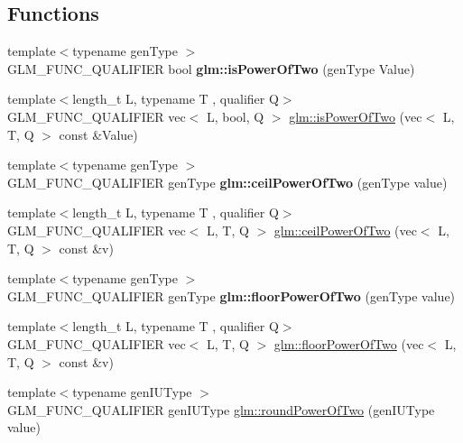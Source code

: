 \subsection*{Functions}
\begin{DoxyCompactItemize}
\item 
\mbox{\label{round_8inl_a2e60d24d864637d3ebd62e6fa4941613}} 
{\footnotesize template$<$typename gen\+Type $>$ }\\G\+L\+M\+\_\+\+F\+U\+N\+C\+\_\+\+Q\+U\+A\+L\+I\+F\+I\+ER bool {\bfseries glm\+::is\+Power\+Of\+Two} (gen\+Type Value)
\item 
{\footnotesize template$<$length\+\_\+t L, typename T , qualifier Q$>$ }\\G\+L\+M\+\_\+\+F\+U\+N\+C\+\_\+\+Q\+U\+A\+L\+I\+F\+I\+ER vec$<$ L, bool, Q $>$ \hyperlink{group__gtc__round_gabf2b61ded7049bcb13e25164f832a290}{glm\+::is\+Power\+Of\+Two} (vec$<$ L, T, Q $>$ const \&Value)
\item 
\mbox{\label{round_8inl_a15ad0f1b70561471f34bc2e43469424e}} 
{\footnotesize template$<$typename gen\+Type $>$ }\\G\+L\+M\+\_\+\+F\+U\+N\+C\+\_\+\+Q\+U\+A\+L\+I\+F\+I\+ER gen\+Type {\bfseries glm\+::ceil\+Power\+Of\+Two} (gen\+Type value)
\item 
{\footnotesize template$<$length\+\_\+t L, typename T , qualifier Q$>$ }\\G\+L\+M\+\_\+\+F\+U\+N\+C\+\_\+\+Q\+U\+A\+L\+I\+F\+I\+ER vec$<$ L, T, Q $>$ \hyperlink{group__gtc__round_gab53d4a97c0d3e297be5f693cdfdfe5d2}{glm\+::ceil\+Power\+Of\+Two} (vec$<$ L, T, Q $>$ const \&v)
\item 
\mbox{\label{round_8inl_ac1385510b859757901e927c43bf4f329}} 
{\footnotesize template$<$typename gen\+Type $>$ }\\G\+L\+M\+\_\+\+F\+U\+N\+C\+\_\+\+Q\+U\+A\+L\+I\+F\+I\+ER gen\+Type {\bfseries glm\+::floor\+Power\+Of\+Two} (gen\+Type value)
\item 
{\footnotesize template$<$length\+\_\+t L, typename T , qualifier Q$>$ }\\G\+L\+M\+\_\+\+F\+U\+N\+C\+\_\+\+Q\+U\+A\+L\+I\+F\+I\+ER vec$<$ L, T, Q $>$ \hyperlink{group__gtc__round_gaf0d591a8fca8ddb9289cdeb44b989c2d}{glm\+::floor\+Power\+Of\+Two} (vec$<$ L, T, Q $>$ const \&v)
\item 
{\footnotesize template$<$typename gen\+I\+U\+Type $>$ }\\G\+L\+M\+\_\+\+F\+U\+N\+C\+\_\+\+Q\+U\+A\+L\+I\+F\+I\+ER gen\+I\+U\+Type \hyperlink{group__gtc__round_gae4e1bf5d1cd179f59261a7342bdcafca}{glm\+::round\+Power\+Of\+Two} (gen\+I\+U\+Type value)

\end{DoxyCompactItemize}
